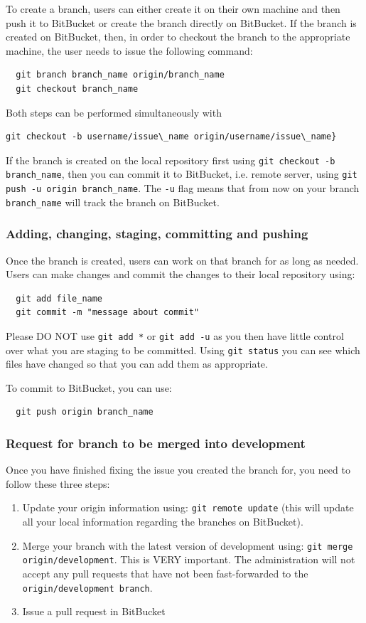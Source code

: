 To create a branch, users can either create it on their own machine and then push it to BitBucket or create the branch directly on BitBucket. If the branch is created on BitBucket, then, in order to checkout the branch to the appropriate machine, the user needs to issue the following command:
\begin{lstlisting}
  git branch branch_name origin/branch_name  
  git checkout branch_name
\end{lstlisting}  
Both steps can be performed simultaneously with
\begin{lstlisting}
git checkout -b username/issue\_name origin/username/issue\_name}
\end{lstlisting}  
 
If the branch is created on the local repository first using \texttt{git checkout -b branch\_name}, then you can commit it to BitBucket, i.e. remote server, using \texttt{git push -u origin branch\_name}.
The \texttt{-u} flag means that from now on your branch \texttt{branch\_name} will track the branch on BitBucket.

\subsubsection{Adding, changing, staging, committing and pushing}
 
Once the branch is created, users can work on that branch for as long as needed. Users can make changes and commit the changes to their local repository using:
\begin{lstlisting}
  git add file_name
  git commit -m "message about commit"
\end{lstlisting} 
Please DO NOT use \texttt{git add *} or \texttt{git add -u} as you then have little control over what you are staging to be  committed. Using \texttt{git status} you can see which files have changed so that you can add them
as appropriate.
 
To commit to BitBucket, you can use:
\begin{lstlisting}
  git push origin branch_name
\end{lstlisting} 

\subsubsection{Request for branch to be merged into development}

Once you have finished fixing the issue you created the branch for, you need to follow these three steps:
\begin{enumerate}
 \item Update your origin information using: \texttt{git remote update} (this will update all your local information regarding the branches on BitBucket).
 \item Merge your branch with the latest version of development using: \texttt{git merge origin/development}. This is VERY important. The administration will not accept any pull requests that 
   have not been fast-forwarded to the \texttt{origin/development branch}.
 \item Issue a pull request in BitBucket
\end{enumerate}

